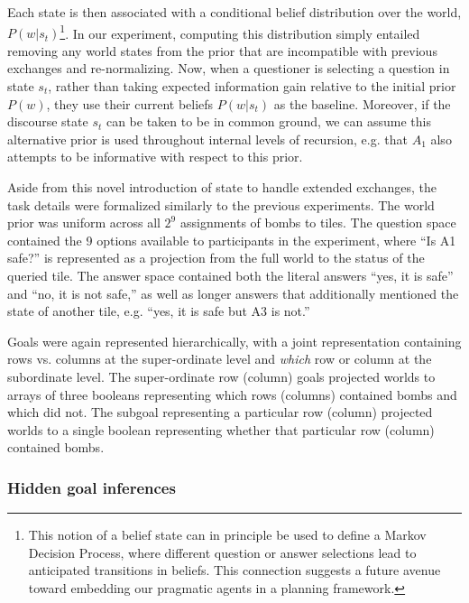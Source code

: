 \documentclass[12pt, floatsintext, jou]{apa6}
\begin{document}
Each state is then associated with a conditional belief distribution over the world, $P(w | s_t)$\footnote{This notion of a belief state can in principle be used to define a Markov Decision Process, where different question or answer selections lead to anticipated transitions in beliefs. This connection suggests a future avenue toward embedding our pragmatic agents in a planning framework.}.
In our experiment, computing this distribution simply entailed removing any world states from the prior that are incompatible with previous exchanges and re-normalizing.
Now, when a questioner is selecting a question in state $s_t$, rather than taking expected information gain relative to the initial prior $P(w)$, they use their current beliefs $P(w | s_t)$ as the baseline.
Moreover, if the discourse state $s_t$ can be taken to be in common ground, we can assume this alternative prior is used throughout internal levels of recursion, e.g. that $A_1$ also attempts to be informative with respect to this prior.

Aside from this novel introduction of state to handle extended exchanges, the task details were formalized similarly to the previous experiments.
The world prior was uniform across all $2^9$ assignments of bombs to tiles. 
The question space contained the 9 options available to participants in the experiment, where ``Is A1 safe?'' is represented as a projection from the full world to the status of the queried tile. 
The answer space contained both the literal answers ``yes, it is safe'' and ``no, it is not safe,'' as well as longer answers that additionally mentioned the state of another tile, e.g. ``yes, it is safe but A3 is not.''

Goals were again represented hierarchically, with a joint representation containing rows vs. columns at the super-ordinate level and \emph{which} row or column at the subordinate level.
The super-ordinate row (column) goals projected worlds to arrays of three booleans representing which rows (columns) contained bombs and which did not.
The subgoal representing a particular row (column) projected worlds to a single boolean representing whether that particular row (column) contained bombs.

\subsubsection{Hidden goal inferences}
\end{document}
